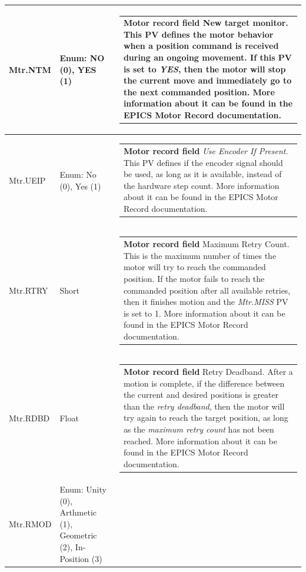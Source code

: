 \documentclass[openany]{article}
\begin{document}
\begin{longtable}{| m{4.5cm} m{2.5cm}  m{8.5cm} |}
        Mtr.NTM & Enum: NO (0), YES (1) & \begin{tabular}{@{}m{6cm}@{}}
                \textbf{\color{ForestGreen} Motor record field} New target monitor. This PV defines the motor behavior when a position command is received during an ongoing movement. If this PV is set to \emph{YES}, then the motor will stop the current move and immediately go to the next commanded position. More information about it can be found in the EPICS Motor Record documentation.
            \end{tabular} \hypertarget{pv:mtr-ueip}{}\\ \hline
        Mtr.UEIP & Enum: No (0), Yes (1) & \begin{tabular}{@{}m{6cm}@{}}
                \textbf{\color{ForestGreen} Motor record field} \emph{Use Encoder If Present}. This PV defines if the encoder signal should be used, as long as it is available, instead of the hardware step count. More information about it can be found in the EPICS Motor Record documentation.
            \end{tabular} \hypertarget{pv:mtr-rtry}{}\\ \hline
        Mtr.RTRY & Short & \begin{tabular}{@{}m{6cm}@{}}
                \textbf{\color{ForestGreen} Motor record field} Maximum Retry Count. This is the maximum number of times the motor will try to reach the commanded position. If the motor fails to reach the commanded position after all available retries, then it finishes motion and the \emph{Mtr.MISS} PV is set to 1. More information about it can be found in the EPICS Motor Record documentation.
            \end{tabular} \hypertarget{pv:mtr-rdbd}{}\\ \hline
        Mtr.RDBD & Float & \begin{tabular}{@{}m{6cm}@{}}
                \textbf{\color{ForestGreen} Motor record field} Retry Deadband. After a motion is complete, if the difference between the current and desired positions is greater than the \emph{retry deadband}, then the motor will try again to reach the target position, as long as the \emph{maximum retry count} has not been reached. More information about it can be found in the EPICS Motor Record documentation.
            \end{tabular} \hypertarget{pv:mtr-rmod}{}\\ \hline
        Mtr.RMOD & Enum: Unity (0), Arthmetic (1), Geometric (2), In-Position (3) & \begin{tabular}{@{}m{6cm}@{}}

\end{tabular}
\end{longtable}
\end{document}
